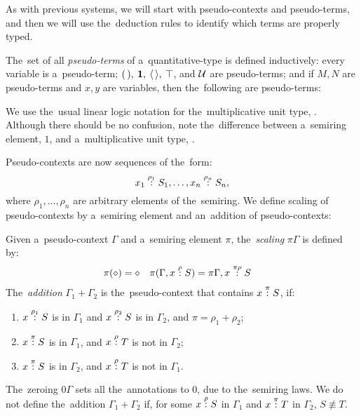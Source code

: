 
As with previous systems, we will start with pseudo-contexts and pseudo-terms,
and then we will use the~deduction rules to identify which terms are properly
typed.

\begin{definition}
  The~set of all \emph{pseudo-terms} of a~quantitative-type \lc is defined
  inductively: every variable is a~pseudo-term; $( \, ), \: \mathbf{1}, \: \langle \, \rangle,
  \: \top$, and $\mathcal{U}$ are pseudo-terms; and if $M, N$ are pseudo-terms and
  $x, y$ are variables, then the~following are pseudo-terms:
\end{definition}
We use the~usual linear logic notation for the~multiplicative unit type, \1.
Although there should be no confusion, note the~difference between a~semiring
element, $1$, and a~multiplicative unit type, \1.

Pseudo-contexts are now sequences of the~form:
\[
  x_1 \overset{\rho_1}: S_1, \dotsc, x_n \overset{\rho_n}: S_n,
\]
where $\rho_1, \dotsc, \rho_n$ are arbitrary elements of the~semiring. We define
scaling of pseudo-contexts by a~semiring element and an~addition of
pseudo-contexts:
\begin{definition}
  Given a~pseudo-context $\Gamma$ and a~semiring element $\pi$,
  the~\emph{scaling} $\pi\Gamma$ is defined by:
  \begin{align*}
    \pi (\diamond) = \diamond&  &  &\pi(\Gamma, x \overset{\rho}: S) = \pi\Gamma,
    x \overset{\pi\rho}: S
  \end{align*}
  The~\emph{addition} $\Gamma_1 + \Gamma_2$ is the~pseudo-context that contains
  $x \overset{\pi}: S$, if:
  \begin{enumerate}
    \item $x \overset{\rho_1}: S$ is in $\Gamma_1$ and $x \overset{\rho_2}: S$ is in
      $\Gamma_2$, and $\pi = \rho_1 + \rho_2$;
    \item $x \overset{\pi}: S$ is in $\Gamma_1$, and $x \overset{\rho}: T$ is not in $\Gamma_2$;
    \item $x \overset{\pi}: S$ is in $\Gamma_2$, and $x \overset{\rho}: T$ is not in $\Gamma_1$.
  \end{enumerate}
\end{definition}
The~zeroing $0\Gamma$ sets all the~annotations to $0$, due to the~semiring laws.
We do not define the~addition $\Gamma_1 + \Gamma_2$ if, for some $x \overset{\rho}: S$
in $\Gamma_1$ and $x \overset{\pi}: T$ in $\Gamma_2$, $S \not\equiv T$.

